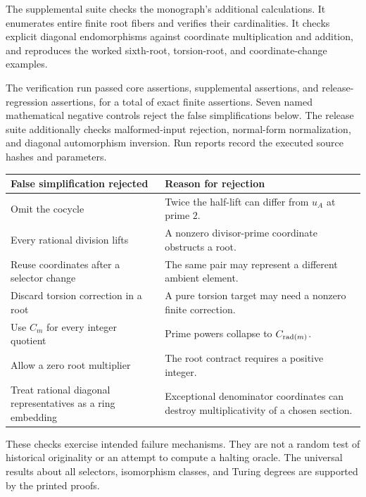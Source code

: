 The supplemental suite checks the monograph's additional calculations. It enumerates entire finite root fibers and verifies their cardinalities. It checks explicit diagonal endomorphisms against coordinate multiplication and addition, and reproduces the worked sixth-root, torsion-root, and coordinate-change examples.

The verification run passed \BaseAssertions{} core assertions, \ExtraAssertions{} supplemental assertions, and \ReleaseAssertions{} release-regression assertions, for a total of \AllAssertions{} exact finite assertions. Seven named mathematical negative controls reject the false simplifications below. The release suite additionally checks malformed-input rejection, normal-form normalization, and diagonal automorphism inversion. Run reports record the executed source hashes and parameters.

\begin{center}
\begin{tabularx}{\textwidth}{@{}p{}X@{}}
\toprule
False simplification rejected&Reason for rejection\\\midrule
Omit the cocycle&Twice the half-lift can differ from $u_A$ at prime $2$.\\
Every rational division lifts&A nonzero divisor-prime coordinate obstructs a root.\\
Reuse coordinates after a selector change&The same pair may represent a different ambient element.\\
Discard torsion correction in a root&A pure torsion target may need a nonzero finite correction.\\
Use $C_m$ for every integer quotient&Prime powers collapse to $C_{\operatorname{rad}(m)}$.\\
Allow a zero root multiplier&The root contract requires a positive integer.\\
Treat rational diagonal representatives as a ring embedding&Exceptional denominator coordinates can destroy multiplicativity of a chosen section.\\\bottomrule
\end{tabularx}
\end{center}

These checks exercise intended failure mechanisms. They are not a random test of historical originality or an attempt to compute a halting oracle. The universal results about all selectors, isomorphism classes, and Turing degrees are supported by the printed proofs.

